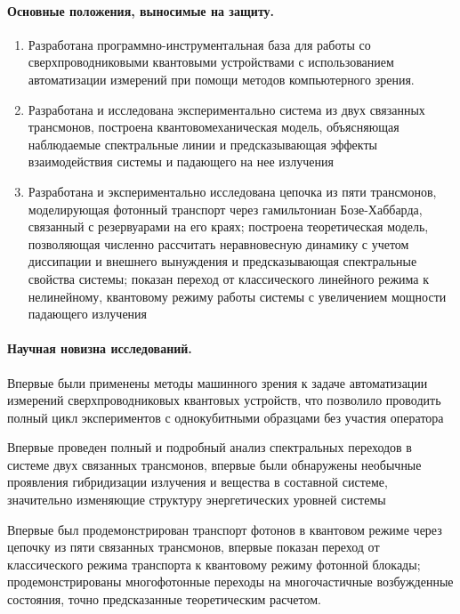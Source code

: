 \documentclass[14pt, a4paper]{extarticle}
\begin{document}
\paragraph{Основные положения, выносимые на защиту.}

\begin{enumerate}
	\item Разработана программно-инструментальная база для работы со сверхпроводниковыми квантовыми устройствами с использованием автоматизации измерений при помощи методов компьютерного зрения.
	\item Разработана и исследована экспериментально система из двух связанных трансмонов, построена квантовомеханическая модель, объясняющая наблюдаемые спектральные линии и предсказывающая эффекты взаимодействия системы и падающего на нее излучения
	\item Разработана и экспериментально исследована цепочка из пяти трансмонов, моделирующая фотонный транспорт через гамильтониан Бозе-Хаббарда, связанный с резервуарами на его краях; построена теоретическая модель, позволяющая численно рассчитать неравновесную динамику с учетом диссипации и внешнего вынуждения и предсказывающая спектральные свойства системы; показан переход от классического линейного режима к нелинейному, квантовому режиму работы системы с увеличением мощности падающего излучения
\end{enumerate}
	
\paragraph{Научная новизна исследований.} Впервые были применены методы машинного зрения к задаче автоматизации измерений сверхпроводниковых квантовых устройств, что позволило проводить полный цикл экспериментов с однокубитными образцами без участия оператора

Впервые проведен полный и подробный анализ спектральных переходов в системе двух связанных трансмонов, впервые были обнаружены необычные проявления гибридизации излучения и вещества в составной системе, значительно изменяющие структуру энергетических уровней системы

Впервые был продемонстрирован транспорт фотонов в квантовом режиме через цепочку из пяти связанных трансмонов, впервые показан переход от классического режима транспорта к квантовому режиму фотонной блокады; продемонстрированы многофотонные переходы на многочастичные возбужденные состояния, точно предсказанные теоретическим расчетом.
\end{document}
